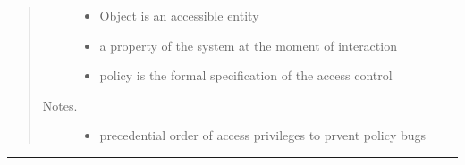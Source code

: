 \documentclass[letterpaper,10pt,english]{sphinxmanual}
\begin{document}
\begin{quote}
\begin{description}
\begin{itemize}
\item {} 
Object is an accessible entity

\item {} 
a property of the system at the moment of interaction

\item {} 
policy is the formal specification of the access control

\end{itemize}

\item[{Notes.}] \leavevmode\begin{itemize}
\item {} 
precedential order of access privileges to prvent policy bugs

\end{itemize}

\end{description}
\end{quote}


\bigskip\hrule{}\bigskip
\end{document}
